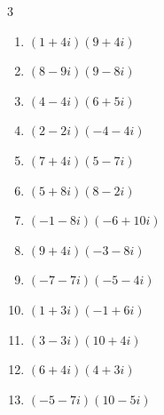\begin{multicols}{3}
\begin{enumerate}
  \item $\displaystyle (1+4i)(9+4i)$

        \phantom{$\displaystyle =-7+40i$}

  \item $\displaystyle (8-9i)(9-8i)$

        \phantom{$\displaystyle =-145i$}

  \item $\displaystyle (4-4i)(6+5i)$

        \phantom{$\displaystyle =44-4i$}

  \item $\displaystyle (2-2i)(-4-4i)$

        \phantom{$\displaystyle =-16$}

  \item $\displaystyle (7+4i)(5-7i)$

        \phantom{$\displaystyle =63-29i$}

  \item $\displaystyle (5+8i)(8-2i)$

        \phantom{$\displaystyle =56+54i$}

  \item $\displaystyle (-1-8i)(-6+10i)$

        \phantom{$\displaystyle =86+38i$}

  \item $\displaystyle (9+4i)(-3-8i)$

        \phantom{$\displaystyle =5-84i$}

  \item $\displaystyle (-7-7i)(-5-4i)$

        \phantom{$\displaystyle =7+63i$}

\columnbreak %

  \item $\displaystyle (1+3i)(-1+6i)$

        \phantom{$\displaystyle =-19+3i$}

  \item $\displaystyle (3-3i)(10+4i)$

        \phantom{$\displaystyle =42-18i$}

  \item $\displaystyle (6+4i)(4+3i)$

        \phantom{$\displaystyle =12+34i$}

  \item $\displaystyle (-5-7i)(10-5i)$

        \phantom{$\displaystyle =-85-45i$}


\end{enumerate}
\end{multicols}
